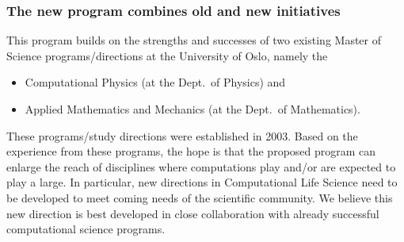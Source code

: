 \documentclass{beamer}
\begin{document}
\begin{frame}
\titlepage
\end{frame}

\begin{frame}
\frametitle{The new program combines old and new initiatives}

\begin{block}{}

This program builds on the strengths and successes of two existing Master of Science programs/directions at the University of Oslo, namely the 
\begin{itemize}
 \item Computational Physics (at the Dept.~of Physics) and

 \item Applied Mathematics and Mechanics (at the Dept.~of Mathematics).
\end{itemize}

\noindent
These programs/study directions  were established in 2003.
Based on the experience from these programs, the hope is that the proposed program can enlarge the reach of disciplines where computations play and/or are expected to play  a large. In particular, new directions 
in Computational Life Science need to  be developed to
meet coming needs of the scientific community. We believe this new direction is
best developed in close collaboration with already successful
computational science programs.  


\end{block}
\end{frame}
\end{document}
